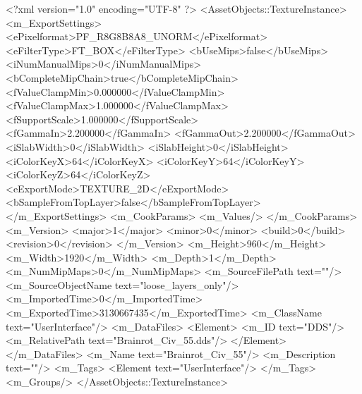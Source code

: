 <?xml version="1.0" encoding="UTF-8" ?>
<AssetObjects::TextureInstance>
	<m_ExportSettings>
		<ePixelformat>PF_R8G8B8A8_UNORM</ePixelformat>
		<eFilterType>FT_BOX</eFilterType>
		<bUseMips>false</bUseMips>
		<iNumManualMips>0</iNumManualMips>
		<bCompleteMipChain>true</bCompleteMipChain>
		<fValueClampMin>0.000000</fValueClampMin>
		<fValueClampMax>1.000000</fValueClampMax>
		<fSupportScale>1.000000</fSupportScale>
		<fGammaIn>2.200000</fGammaIn>
		<fGammaOut>2.200000</fGammaOut>
		<iSlabWidth>0</iSlabWidth>
		<iSlabHeight>0</iSlabHeight>
		<iColorKeyX>64</iColorKeyX>
		<iColorKeyY>64</iColorKeyY>
		<iColorKeyZ>64</iColorKeyZ>
		<eExportMode>TEXTURE_2D</eExportMode>
		<bSampleFromTopLayer>false</bSampleFromTopLayer>
	</m_ExportSettings>
	<m_CookParams>
		<m_Values/>
	</m_CookParams>
	<m_Version>
		<major>1</major>
		<minor>0</minor>
		<build>0</build>
		<revision>0</revision>
	</m_Version>
	<m_Height>960</m_Height>
	<m_Width>1920</m_Width>
	<m_Depth>1</m_Depth>
	<m_NumMipMaps>0</m_NumMipMaps>
	<m_SourceFilePath text=""/>
	<m_SourceObjectName text="loose_layers_only"/>
	<m_ImportedTime>0</m_ImportedTime>
	<m_ExportedTime>3130667435</m_ExportedTime>
	<m_ClassName text="UserInterface"/>
	<m_DataFiles>
		<Element>
			<m_ID text="DDS"/>
			<m_RelativePath text="Brainrot_Civ_55.dds"/>
		</Element>
	</m_DataFiles>
	<m_Name text="Brainrot_Civ_55"/>
	<m_Description text=""/>
	<m_Tags>
		<Element text="UserInterface"/>
	</m_Tags>
	<m_Groups/>
</AssetObjects::TextureInstance>

